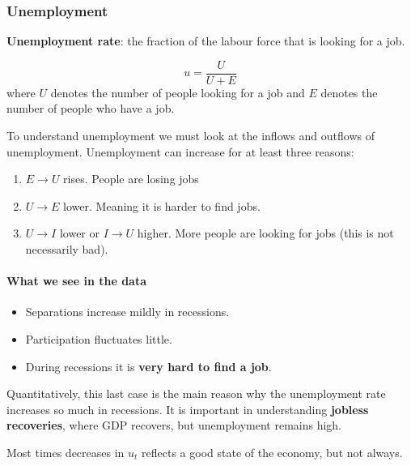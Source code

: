 \documentclass[11pt]{article}
\begin{document}
\subsubsection{Unemployment}

\begin{definition}
    \textbf{Unemployment rate}: the fraction of the labour force that is looking for a job.

    \[u = \dfrac{U}{U+E}\]
    where $U$ denotes the number of people looking for a job and $E$ denotes the number of people who have a job.
\end{definition}

To understand unemployment we must look at the inflows and outflows of unemployment. Unemployment can increase for at least three reasons:
\begin{enumerate}
    \item $E\rightarrow U$ rises. People are losing jobs
    \item $U\rightarrow E$ lower. Meaning it is harder to find jobs.
    \item $U\rightarrow I$ lower or $I \rightarrow U$ higher. More people are looking for jobs (this is not necessarily bad).
\end{enumerate}

\paragraph{What we see in the data} \mbox{}

\begin{itemize}
    \item Separations increase mildly in recessions.
    \item Participation fluctuates little.
    \item During recessions it is \textbf{very hard to find a job}.
\end{itemize}

Quantitatively, this last case is the main reason why the unemployment rate increases so much in recessions. It is important in understanding \textbf{jobless recoveries}, where GDP recovers, but unemployment remains high.

Most times decreases in $u_t$ reflects a good state of the economy, but not always.








\newpage
\printbibliography
\end{document}
